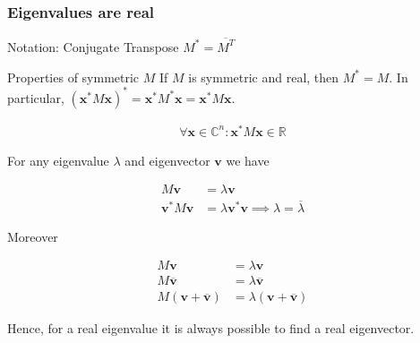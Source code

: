 \documentclass[8pt]{beamer}
\begin{document}
\begin{frame}
\frametitle{Eigenvalues are real}

\begin{block}{Notation: Conjugate Transpose}
$M^* = \overline{M^T}$
\end{block}

\begin{block}{Properties of symmetric $M$}
If $M$ is symmetric and real, then $M^* = M$. In particular, $(\mathbf{x}^* M \mathbf{x})^* = \mathbf{x}^* M^* \mathbf{x} = \mathbf{x}^* M \mathbf{x}$.

\begin{align*}
 \forall \mathbf{x} \in \mathbb{C}^n : \mathbf{x}^* M \mathbf{x} \in \mathbb{R}
\end{align*}

For any eigenvalue $\lambda$ and eigenvector $\mathbf{v}$ we have

\begin{align*}
    M \mathbf{v} &= \lambda \mathbf{v} \\
    \mathbf{v}^* M \mathbf{v} &= \lambda \mathbf{v}^* \mathbf{v} \implies \lambda = \overline{\lambda}
\end{align*}

Moreover

\begin{align*}
    M \mathbf{v} &= \lambda \mathbf{v} \\
    M \overline{\mathbf{v}} &= \lambda \overline{\mathbf{v}} \\
    M (\mathbf{v} + \overline{\mathbf{v}}) &= \lambda (\mathbf{v} + \overline{\mathbf{v}})
\end{align*}

Hence, for a real eigenvalue it is always possible to find a real eigenvector.

\end{block}

\end{frame}

\end{document}

